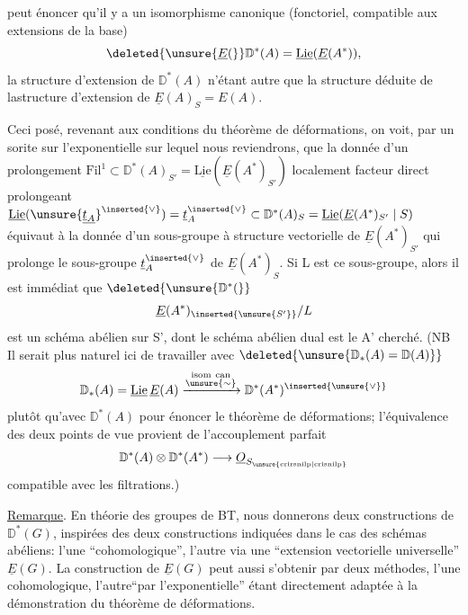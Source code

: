 peut énoncer qu'il y a un isomorphisme canonique (fonctoriel, compatible aux extensions de la base)
\[
\deleted{\unsure{\underline{E}(}}\mathbb{D}^{*}(A)=\underline{\mathrm{Lie}}(\underline{E}(A^{*})),
\]
la structure d'extension de $\mathbb{D}^{*}(A)$ n'étant autre que la structure déduite de lastructure d'extension de $\underline{E}(A)_S=E(A)$.

Ceci posé, revenant aux conditions du théorème de déformations, on voit, par un sorite sur l'exponentielle sur lequel nous reviendrons, que la donnée d'un prolongement $\mathrm{Fil}^{1}\subset\mathbb{D}^{*}(A)_{S'}=\underline{\mathrm{Lie}}(\underline{E}(A^{*})_{S'})$ localement facteur direct prolongeant $\underline{\mathrm{Lie}}(\unsure{\underline{\underline{t}_A}}^{\inserted{\vee}})=\underline{t}_A^{\inserted{\vee}}\subset\mathbb{D}^{*}(A)_S=\underline{\mathrm{Lie}}(\underline{E}(A^{*})_{S'}\mid S)$ équivaut à la donnée d'un sous-groupe  à structure vectorielle de $\underline{E}(A^{*})_{S'}$ qui prolonge le sous-groupe $\underline{t}_A^{\inserted{\vee}}$ de $\underline{E}(A^{*})_S$. Si L est ce sous-groupe, alors il est immédiat que $\deleted{\unsure{\mathbb{D}^{*}(}}$
\[
\underline{E}(A^{*})_{\inserted{\unsure{S'}}}/L
\]
est un schéma abélien sur S', dont le schéma abélien dual est le A' cherché. (NB Il serait plus naturel ici de travailler avec $\deleted{\unsure{\mathbb{D}_{*}(A)=\mathbb{D}(A)}}$
\[
\mathbb{D}_{*}(A)=\underline{\mathrm{Lie}}\,\underline{E}(A)\xrightarrow{\substack{\mathrm{isom\ can}\\\unsure{\sim}}}\mathbb{D}^{*}(A^{*})^{\inserted{\unsure{\vee}}}
\]
plutôt qu'avec $\mathbb{D}^{*}(A)$ pour énoncer le théorème de déformations; l'équivalence des deux points de vue provient de l'accouplement parfait
\[
\mathbb{D}^{*}(A)\otimes\mathbb{D}^{*}(A^{*})\longrightarrow\underline{O}_{S_{\mathrm{\unsure{crirsnilp|crisnilp}}}}
\]
compatible avec les filtrations.)

\uline{Remarque}. En théorie des groupes de BT, nous donnerons deux constructions de $\mathbb{D}^{*}(G)$, inspirées des deux constructions indiquées dans le cas des schémas abéliens: l'une ``cohomologique'', l'autre via une ``extension vectorielle universelle'' $\underline{E}(G)$. La construction de $\underline{E}(G)$ peut aussi s'obtenir par deux méthodes, l'une cohomologique, l'autre``par l'exponentielle'' étant directement adaptée à la démonstration du théorème de déformations.

